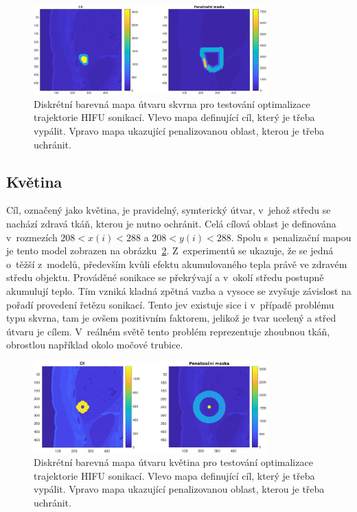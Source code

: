 \begin{figure}[H]
    \centering
	\includegraphics[width=0.8\textwidth]{obrazky-figures/hifuUseCase/blob_croped.pdf}
	\caption{Diskrétní barevná mapa útvaru skvrna pro testování optimalizace trajektorie HIFU sonikací. Vlevo mapa definující cíl, který je třeba vypálit. Vpravo mapa ukazující penalizovanou oblast, kterou je třeba uchránit.}
	\label{fg:hifu:usecase:blob}
\end{figure}

\subsection{Květina}
Cíl, označený jako květina, je pravidelný, symterický útvar, v~jehož středu se nachází zdravá tkáň, kterou je nutno ochránit. Celá cílová oblast je definována v~rozmezích $208 < x(i) < 288$ a $208 < y(i) < 288$. Spolu s~penalizační mapou je tento model zobrazen na obrázku~\ref{fg:hifu:usecase:flower}. Z~experimentů se ukazuje, že se jedná o~těžší z~modelů, především kvůli efektu akumulovaného tepla právě ve zdravém středu objektu. Prováděné sonikace se překrývají a v~okolí středu postupně akumulují teplo. Tím vzniká kladná zpětná vazba a vysoce se zvyšuje závislost na pořadí provedení řetězu sonikací. Tento jev existuje sice i v~případě problému typu skvrna, tam je ovšem pozitivním faktorem, jelikož je tvar ucelený a střed útvaru je cílem. V~reálném světě tento problém reprezentuje zhoubnou tkáň, obrostlou například okolo močové trubice.

\begin{figure}[H]
    \centering
	\includegraphics[width=0.8\textwidth]{obrazky-figures/hifuUseCase/flower_croped.pdf}
	\caption{Diskrétní barevná mapa útvaru květina pro testování optimalizace trajektorie HIFU sonikací. Vlevo mapa definující cíl, který je třeba vypálit. Vpravo mapa ukazující penalizovanou oblast, kterou je třeba uchránit.}
	\label{fg:hifu:usecase:flower}
\end{figure}
	
